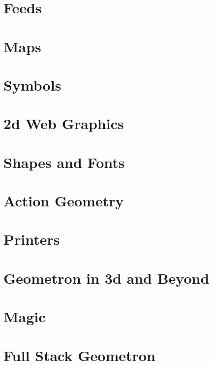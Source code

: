 \documentclass{report}
\begin{document}
\chapter{Feeds}

\chapter{Maps}

\chapter{Symbols}

\chapter{2d Web Graphics}

\chapter{Shapes and Fonts}

\chapter{Action Geometry}

\chapter{Printers}

\chapter{Geometron in 3d and Beyond}

\chapter{Magic}

\chapter{Full Stack Geometron}



\end{document}
